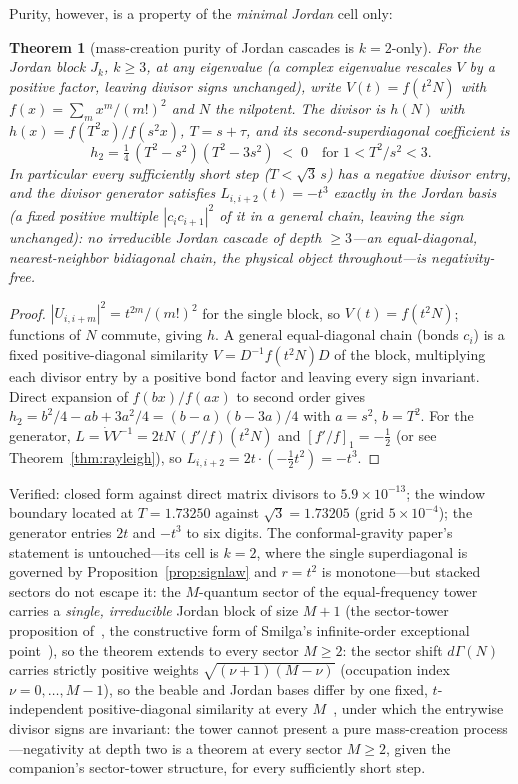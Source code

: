 ﻿\documentclass[11pt]{article}
\newtheorem{theorem}{Theorem}
\theoremstyle{remark}
\begin{document}
Purity, however, is a property of the \emph{minimal Jordan} cell
only:

\begin{theorem}[mass-creation purity of Jordan cascades is
$k=2$-only]
\label{thm:k2}
For the Jordan block $J_k$, $k\ge3$, at any eigenvalue (a complex
eigenvalue rescales $V$ by a positive factor, leaving divisor signs
unchanged), write
$V(t)=f(t^2N)$ with $f(x)=\sum_m x^m/(m!)^2$ and $N$ the nilpotent.
The divisor is $h(N)$ with $h(x)=f(T^2x)/f(s^2x)$, $T=s+\tau$, and
its second-superdiagonal coefficient is
\[
h_2=\tfrac14\,(T^2-s^2)(T^2-3s^2)\;<\;0
\quad\text{for }1<T^2/s^2<3 .
\]
In particular every sufficiently short step ($T<\sqrt3\,s$) has a
negative divisor entry, and the divisor generator satisfies
$L_{i,i+2}(t)=-t^3$ exactly in the Jordan basis (a fixed positive multiple
$|c_ic_{i+1}|^2$ of it in a general chain, leaving the sign unchanged): no irreducible Jordan cascade of depth $\ge3$---an
equal-diagonal, nearest-neighbor bidiagonal chain, the physical object
throughout---is negativity-free.
\end{theorem}

\begin{proof}
$|U_{i,i+m}|^2=t^{2m}/(m!)^2$ for the single block, so
$V(t)=f(t^2N)$; functions of $N$ commute, giving $h$. A general
equal-diagonal chain (bonds $c_i$) is a fixed positive-diagonal
similarity $V=D^{-1}f(t^2N)D$ of the block, multiplying each divisor
entry by a positive bond factor and leaving every sign invariant. Direct
expansion of $f(bx)/f(ax)$ to second order gives
$h_2=b^2/4-ab+3a^2/4=(b-a)(b-3a)/4$ with $a=s^2$, $b=T^2$. For the
generator, $L=\dot V V^{-1}=2tN\,(f'/f)(t^2N)$ and
$[f'/f]_1=-\tfrac12$ (or see Theorem~\ref{thm:rayleigh}), so
$L_{i,i+2}=2t\cdot(-\tfrac12 t^2)=-t^3$.
\end{proof}

Verified: closed form against direct matrix divisors to
$5.9\times10^{-13}$; the window boundary located at
$T=1.73250$ against $\sqrt3=1.73205$ (grid $5\times10^{-4}$); the
generator entries $2t$ and $-t^3$ to six digits. The conformal-gravity
paper's statement is untouched---its cell is $k=2$, where the single
superdiagonal is governed by Proposition~\ref{prop:signlaw} and
$r=t^2$ is monotone---but stacked sectors do not escape it: the
$M$-quantum sector of the equal-frequency tower carries a
\emph{single, irreducible} Jordan block of size $M{+}1$ (the
sector-tower proposition of~\cite{choosing}, the constructive
form of Smilga's infinite-order exceptional
point~\cite{Smilga2014}), so the theorem extends to every sector
$M\ge2$: the sector shift $d\Gamma(N)$ carries strictly positive weights
$\sqrt{(\nu+1)(M-\nu)}$ (occupation index $\nu=0,\dots,M{-}1$), so the beable and Jordan bases differ by one fixed,
$t$-independent positive-diagonal similarity at every $M$~\cite{choosing},
under which the entrywise divisor signs are invariant: the
tower cannot present a pure mass-creation
process---negativity at depth two is a theorem at every sector $M\ge2$, given the
companion's sector-tower structure, for every sufficiently short step.
\end{document}
